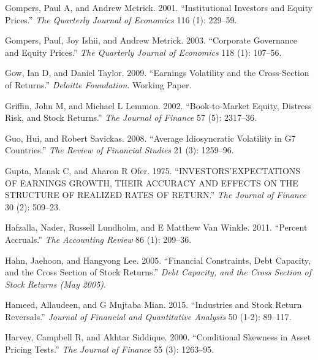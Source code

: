 \documentclass[
  letterpaper,
  DIV=11,
  numbers=noendperiod]{scrreprt}
\newlength{\cslhangindent}
\newlength{\cslentryspacingunit} %
\newenvironment{CSLReferences}[2] %
 {%
  \setlength{\parindent}{0pt}
  \ifodd #1
  \let\oldpar\par
  \def\par{\hangindent=\cslhangindent\oldpar}
  \fi
  \setlength{\parskip}{#2\cslentryspacingunit}
 }%
 {}
\begin{document}
\begin{CSLReferences}{1}{0}
\leavevmode{}%
Gompers, Paul A, and Andrew Metrick. 2001. {``Institutional Investors
and Equity Prices.''} \emph{The Quarterly Journal of Economics} 116 (1):
229--59.

\leavevmode{}%
Gompers, Paul, Joy Ishii, and Andrew Metrick. 2003. {``Corporate
Governance and Equity Prices.''} \emph{The Quarterly Journal of
Economics} 118 (1): 107--56.

\leavevmode{}%
Gow, Ian D, and Daniel Taylor. 2009. {``Earnings Volatility and the
Cross-Section of Returns.''} \emph{Deloitte Foundation}. Working Paper.

\leavevmode{}%
Griffin, John M, and Michael L Lemmon. 2002. {``Book-to-Market Equity,
Distress Risk, and Stock Returns.''} \emph{The Journal of Finance} 57
(5): 2317--36.

\leavevmode{}%
Guo, Hui, and Robert Savickas. 2008. {``Average Idiosyncratic Volatility
in G7 Countries.''} \emph{The Review of Financial Studies} 21 (3):
1259--96.

\leavevmode{}%
Gupta, Manak C, and Aharon R Ofer. 1975. {``INVESTORS'EXPECTATIONS OF
EARNINGS GROWTH, THEIR ACCURACY AND EFFECTS ON THE STRUCTURE OF REALIZED
RATES OF RETURN.''} \emph{The Journal of Finance} 30 (2): 509--23.

\leavevmode{}%
Hafzalla, Nader, Russell Lundholm, and E Matthew Van Winkle. 2011.
{``Percent Accruals.''} \emph{The Accounting Review} 86 (1): 209--36.

\leavevmode{}%
Hahn, Jaehoon, and Hangyong Lee. 2005. {``Financial Constraints, Debt
Capacity, and the Cross Section of Stock Returns.''} \emph{Debt
Capacity, and the Cross Section of Stock Returns (May 2005)}.

\leavevmode{}%
Hameed, Allaudeen, and G Mujtaba Mian. 2015. {``Industries and Stock
Return Reversals.''} \emph{Journal of Financial and Quantitative
Analysis} 50 (1-2): 89--117.

\leavevmode{}%
Harvey, Campbell R, and Akhtar Siddique. 2000. {``Conditional Skewness
in Asset Pricing Tests.''} \emph{The Journal of Finance} 55 (3):
1263--95.


\end{CSLReferences}
\end{document}
